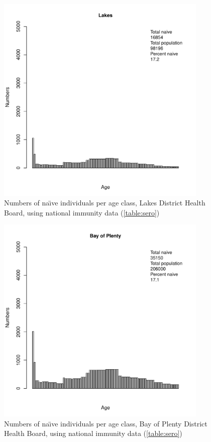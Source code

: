 \documentclass{article}
\begin{document}
\begin{figure}[H]
     \begin{center}
     \includegraphics[width=0.9\textwidth]{dhb6.pdf}
     \end{center}
     \caption{Numbers of na\"{\i}ve individuals per age class, Lakes District Health Board, using national immunity data (\autoref{table:sero})}
     \label{fig:Lakes}
\end{figure}

\begin{figure}[H]
     \begin{center}
     \includegraphics[width=0.9\textwidth]{dhb7.pdf}
     \end{center}
     \caption{Numbers of na\"{\i}ve individuals per age class, Bay of Plenty District Health Board, using national immunity data (\autoref{table:sero})}
     \label{fig:BayofPlenty}
\end{figure}
\end{document}
